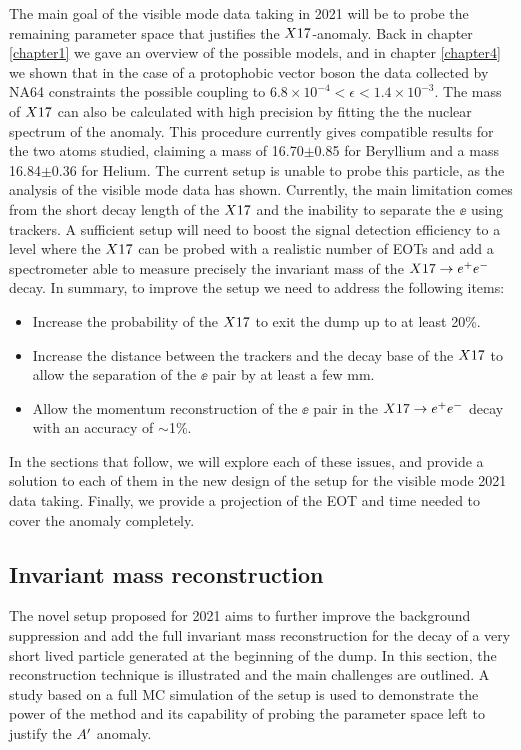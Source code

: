 The main goal of the visible mode data taking in 2021 will be to probe the remaining parameter space that justifies the $X17$-anomaly. Back in chapter \ref{chapter1} we gave an overview of the possible models, and in chapter \ref{chapter4} we shown that in the case of a protophobic vector boson the data collected by NA64 constraints the possible coupling to $6.8 \times 10^{-4} < \epsilon < 1.4 \times 10^{-3}$. The mass of $X17$ can also be calculated with high precision by fitting the the nuclear spectrum of the anomaly. This procedure currently gives compatible results for the two atoms studied, claiming a mass of 16.70$\pm$0.85 \mev for Beryllium and a mass 16.84$\pm$0.36 \mev for Helium. The current setup is unable to probe this particle, as the analysis of the visible mode data has shown. Currently, the main limitation comes from the short decay length of the $X17$ and the inability to separate the $\ee$ using trackers. A sufficient setup will need to boost the signal detection efficiency to a level where the $X17$ can be probed with a realistic number of EOTs and add a spectrometer able to measure precisely the invariant mass of the $X17 \rightarrow e^+ e^-$ decay. In summary, to improve the setup we need to address the following items:

\begin{itemize}
\item Increase the probability of the $X17$ to exit the dump up to at least 20\%.
\item Increase the distance between the trackers and the decay base of the $X17$ to allow the separation of the $\ee$ pair by at least a few mm.
\item Allow the momentum reconstruction of the $\ee$ pair in the $X17 \rightarrow e^+ e^-$ decay with an accuracy of $\sim$1\%.
\end{itemize}

In the sections that follow, we will explore each of these issues, and provide a solution to each of them in the new design of the setup for the visible mode 2021 data taking.  Finally, we provide a projection of the EOT and time needed to cover the anomaly completely.

\subsection{Invariant mass reconstruction}
\label{ch5:sec:new-vismode-setup-invmass}

The novel setup proposed for 2021 aims to further improve the background suppression and add the full invariant mass reconstruction for the decay of a very short lived particle generated at the beginning of the dump. In this section, the reconstruction technique is illustrated and the main challenges are outlined. A study based on a full MC simulation of the setup is used to demonstrate the power of the method and its capability of probing the parameter space left to justify the $A'$ anomaly.

